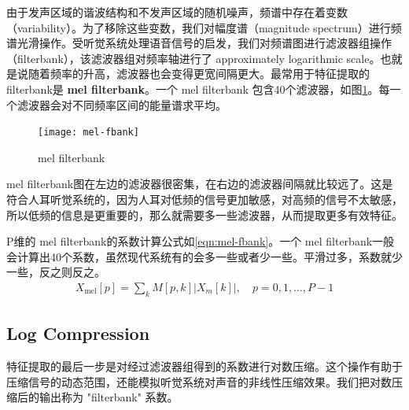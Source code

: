 由于发声区域的谐波结构和不发声区域的随机噪声，频谱中存在着变数（variability）。为了移除这些变数，我们对幅度谱（magnitude spectrum）进行频谱光滑操作。受听觉系统处理语音信号的启发，我们对频谱图进行滤波器组操作（filterbank），该滤波器组对频率轴进行了 approximately logarithmic scale。也就是说随着频率的升高，滤波器也会变得更宽间隔更大。最常用于特征提取的filterbank是 {\bf mel filterbank}。一个 mel filterbank 包含40个滤波器，如图\ref{fig:mel-fbank}。每一个滤波器会对不同频率区间的能量谱求平均。
\begin{figure}[htbp]
  \centering
  \texttt{[image: mel-fbank]}
  \caption{mel filterbank \label{fig:mel-fbank}}
\end{figure}

mel filterbank图在左边的滤波器很密集，在右边的滤波器间隔就比较远了。这是符合人耳听觉系统的，因为人耳对低频的信号更加敏感，对高频的信号不太敏感，所以低频的信息是更重要的，那么就需要多一些滤波器，从而提取更多有效特征。

P维的 mel filterbank的系数计算公式如\ref{eqn:mel-fbank}。一个 mel filterbank一般会计算出40个系数，虽然现代系统有的会多一些或者少一些。平滑过多，系数就少一些，反之则反之。
\begin{align}
\label{eqn:mel-fbank}
  X_{\mathrm{mel}}[p]=\sum_{k} M[p, k]\left|X_{m}[k]\right|, \quad p=0,1, \ldots, P-1
\end{align}


\subsection{Log Compression} %
\label{sub:log_compression}
特征提取的最后一步是对经过滤波器组得到的系数进行对数压缩。这个操作有助于压缩信号的动态范围，还能模拟听觉系统对声音的非线性压缩效果。我们把对数压缩后的输出称为 "filterbank" 系数。

